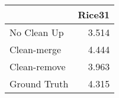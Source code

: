 \begin{tabular}{lr}
\toprule
{} & Rice31 \\
\midrule
No Clean Up  &  3.514 \\
Clean-merge  &  4.444 \\
Clean-remove &  3.963 \\
Ground Truth &  4.315 \\
\bottomrule
\end{tabular}
